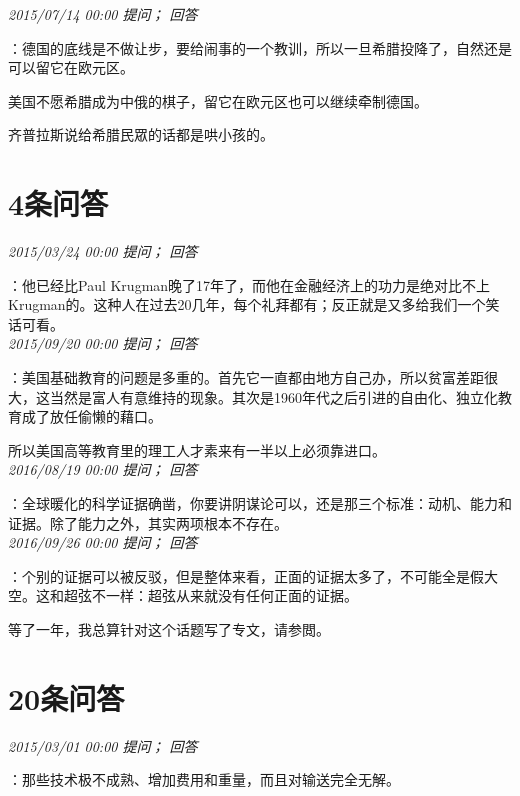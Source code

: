 \documentclass[twocolumn]{ctexart}
\begin{document}
\textit{\hfill\noindent\small 2015/07/14 00:00 提问； 回答}

：德国的底线是不做让步，要给闹事的一个教训，所以一旦希腊投降了，自然还是可以留它在欧元区。

美国不愿希腊成为中俄的棋子，留它在欧元区也可以继续牵制德国。

齐普拉斯说给希腊民眾的话都是哄小孩的。\\

\section{4条问答}

\textit{\hfill\noindent\small 2015/03/24 00:00 提问； 回答}

：他已经比Paul Krugman晚了17年了，而他在金融经济上的功力是绝对比不上Krugman的。这种人在过去20几年，每个礼拜都有；反正就是又多给我们一个笑话可看。\\

\textit{\hfill\noindent\small 2015/09/20 00:00 提问； 回答}

：美国基础教育的问题是多重的。首先它一直都由地方自己办，所以贫富差距很大，这当然是富人有意维持的现象。其次是1960年代之后引进的自由化、独立化教育成了放任偷懒的藉口。

所以美国高等教育里的理工人才素来有一半以上必须靠进口。\\

\textit{\hfill\noindent\small 2016/08/19 00:00 提问； 回答}

：全球暖化的科学证据确凿，你要讲阴谋论可以，还是那三个标准：动机、能力和证据。除了能力之外，其实两项根本不存在。\\

\textit{\hfill\noindent\small 2016/09/26 00:00 提问； 回答}

：个别的证据可以被反驳，但是整体来看，正面的证据太多了，不可能全是假大空。这和超弦不一样：超弦从来就没有任何正面的证据。

等了一年，我总算针对这个话题写了专文，请参閲。\\

\section{20条问答}

\textit{\hfill\noindent\small 2015/03/01 00:00 提问； 回答}

：那些技术极不成熟、增加费用和重量，而且对输送完全无解。
\end{document}
